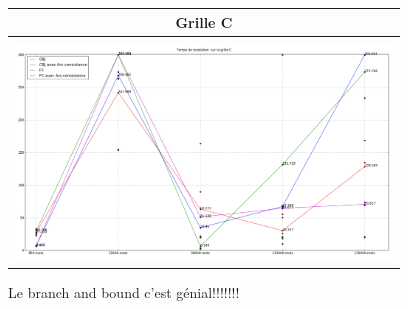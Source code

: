 \documentclass[a4paper,12pt]{report}
\begin{document}
\begin{enumerate}
\begin{table}[!h]
\begin{center}
\begin{tabular}{|c|}
\hline
Grille C \\
\hline
\\
\includegraphics[width=10cm]{Grille_C.png}\\

\hline

\end{tabular}
\end{center}
\end{table}

\end{enumerate}

Le branch and bound c'est génial!!!!!!!
\end{document}
